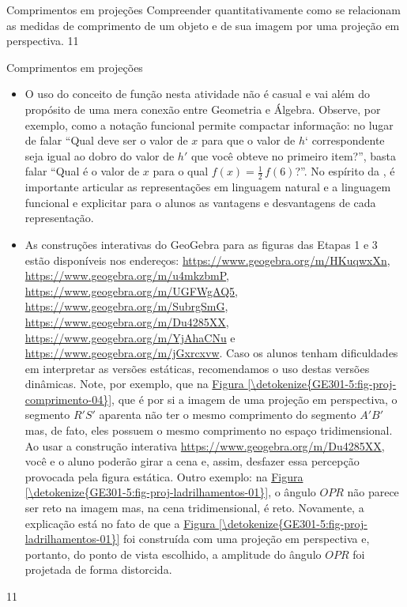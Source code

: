 \clearpage

\begin{objectives}{Comprimentos em projeções}
{
Compreender quantitativamente como se relacionam as medidas de comprimento de um objeto e de sua imagem por uma projeção em perspectiva.
}{1}{1}
\end{objectives}
\begin{sugestions}{Comprimentos em projeções}
{
\begin{itemize}
\item {} 
O uso do conceito de função nesta atividade não é casual e vai além do propósito de uma mera conexão entre Geometria e Álgebra. Observe, por exemplo, como a notação funcional permite compactar informação: no lugar de falar “Qual deve ser o valor de \(x\) para que o valor de \(h\)‘ correspondente seja igual ao dobro do valor de \(h'\) que você obteve no primeiro item?”, basta falar “Qual é o valor de \(x\) para o qual \(f(x) = \frac{1}{2} \, f(6)\)?”. No espírito da , é importante articular as representações em linguagem natural e a linguagem funcional e explicitar para o alunos as vantagens e desvantagens de cada representação.

\item {} 
As construções interativas do GeoGebra para as figuras das Etapas 1 e 3 estão disponíveis nos endereços: \url{https://www.geogebra.org/m/HKuqwxXn}, \url{https://www.geogebra.org/m/u4mkzbmP}, \url{https://www.geogebra.org/m/UGFWgAQ5}, \url{https://www.geogebra.org/m/SubrgSmG}, \url{https://www.geogebra.org/m/Du4285XX}, \url{https://www.geogebra.org/m/YjAhaCNu} e \url{https://www.geogebra.org/m/jGxrcxvw}. Caso os alunos tenham dificuldades em interpretar as versões estáticas, recomendamos o uso destas versões dinâmicas. Note, por exemplo, que na \hyperref[\detokenize{GE301-5:fig-proj-comprimento-04}]{Figura \ref{\detokenize{GE301-5:fig-proj-comprimento-04}}}, que é por si a imagem de uma projeção em perspectiva, o segmento \(R'S'\) aparenta não ter o mesmo comprimento do segmento \(A'B'\) mas, de fato, eles possuem o mesmo comprimento no espaço tridimensional. Ao usar a construção interativa \url{https://www.geogebra.org/m/Du4285XX}, você e o aluno poderão girar a cena e, assim, desfazer essa percepção provocada pela figura estática. Outro exemplo: na \hyperref[\detokenize{GE301-5:fig-proj-ladrilhamentos-01}]{Figura \ref{\detokenize{GE301-5:fig-proj-ladrilhamentos-01}}}, o ângulo \(OPR\) não parece ser reto na imagem mas, na cena tridimensional, é reto. Novamente, a explicação está no fato de que a \hyperref[\detokenize{GE301-5:fig-proj-ladrilhamentos-01}]{Figura \ref{\detokenize{GE301-5:fig-proj-ladrilhamentos-01}}} foi construída com uma projeção em perspectiva e, portanto, do ponto de vista escolhido, a amplitude do ângulo \(OPR\) foi projetada de forma distorcida.

\end{itemize}
}{1}{1}
\end{sugestions}
